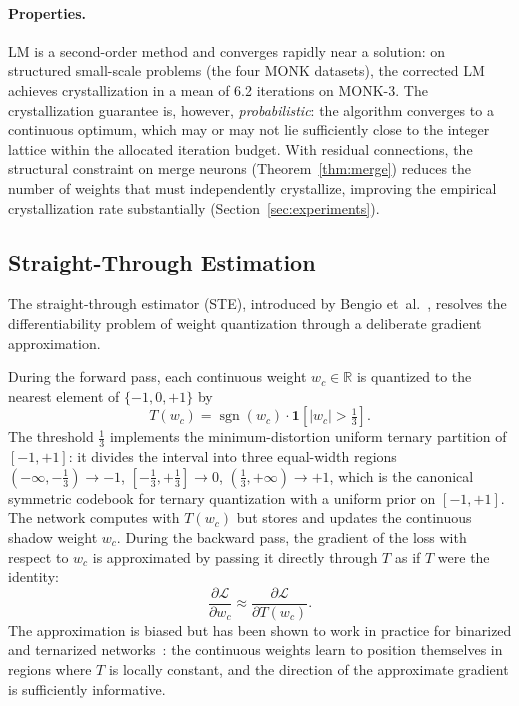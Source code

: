 \documentclass[10pt,a4paper,twoside]{article}
\begin{document}
\paragraph{Properties.}
LM is a second-order method and converges rapidly near a solution:
on structured small-scale problems (the four MONK datasets), the corrected
LM achieves crystallization in a mean of 6.2 iterations on MONK-3.
The crystallization guarantee is, however, \emph{probabilistic}: the
algorithm converges to a continuous optimum, which may or may not lie
sufficiently close to the integer lattice within the allocated iteration
budget.
With residual connections, the structural constraint on merge neurons
(Theorem~\ref{thm:merge}) reduces the number of weights that must
independently crystallize, improving the empirical crystallization rate
substantially (Section~\ref{sec:experiments}).

\subsection{Straight-Through Estimation}
\label{ssec:ste}

The straight-through estimator (STE), introduced by Bengio
et~al.~\cite{bengio2013}, resolves the differentiability problem of
weight quantization through a deliberate gradient approximation.

During the forward pass, each continuous weight $w_c \in \mathbb{R}$ is
quantized to the nearest element of $\{-1, 0, +1\}$ by
\begin{equation}
  T(w_c) = \operatorname{sgn}(w_c) \cdot \mathbf{1}\!\left[|w_c| > \tfrac{1}{3}\right].
  \label{eq:T}
\end{equation}
The threshold $\tfrac{1}{3}$ implements the minimum-distortion uniform
ternary partition of $[-1,+1]$: it divides the interval into three
equal-width regions
$(-\infty,-\tfrac{1}{3}) \to -1$,
$[-\tfrac{1}{3},+\tfrac{1}{3}] \to 0$,
$(\tfrac{1}{3},+\infty) \to +1$,
which is the canonical symmetric codebook for ternary quantization with a
uniform prior on $[-1,+1]$.
The network computes with $T(w_c)$ but stores and updates the continuous
shadow weight $w_c$.
During the backward pass, the gradient of the loss with respect to $w_c$ is
approximated by passing it directly through $T$ as if $T$ were the identity:
\begin{equation}
  \frac{\partial \mathcal{L}}{\partial w_c}
    \approx \frac{\partial \mathcal{L}}{\partial T(w_c)}.
  \label{eq:ste}
\end{equation}
The approximation is biased but has been shown to work in practice for
binarized and ternarized networks~\cite{courbariaux2016,li2016}: the
continuous weights learn to position themselves in regions where $T$ is
locally constant, and the direction of the approximate gradient is
sufficiently informative.
\end{document}
